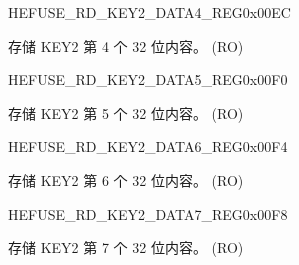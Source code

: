 \begin{register}{H}{EFUSE\_RD\_KEY2\_DATA4\_REG}{0x00EC}\label{regdesc:EFUSERDKEY2DATA4REG}
%
\regnewline%
\begin{regdesc}\begin{reglist}
\label{fielddesc:EFUSEKEY2DATA4}\item [EFUSE\_KEY2\_DATA4] 存储 KEY2 第 4 个 32 位内容。 (RO)
\end{reglist}\end{regdesc}
\end{register}


\begin{register}{H}{EFUSE\_RD\_KEY2\_DATA5\_REG}{0x00F0}\label{regdesc:EFUSERDKEY2DATA5REG}
%
\regnewline%
\begin{regdesc}\begin{reglist}
\label{fielddesc:EFUSEKEY2DATA5}\item [EFUSE\_KEY2\_DATA5] 存储 KEY2 第 5 个 32 位内容。 (RO)
\end{reglist}\end{regdesc}
\end{register}


\begin{register}{H}{EFUSE\_RD\_KEY2\_DATA6\_REG}{0x00F4}\label{regdesc:EFUSERDKEY2DATA6REG}
%
\regnewline%
\begin{regdesc}\begin{reglist}
\label{fielddesc:EFUSEKEY2DATA6}\item [EFUSE\_KEY2\_DATA6] 存储 KEY2 第 6 个 32 位内容。 (RO)
\end{reglist}\end{regdesc}
\end{register}


\begin{register}{H}{EFUSE\_RD\_KEY2\_DATA7\_REG}{0x00F8}\label{regdesc:EFUSERDKEY2DATA7REG}
%
\regnewline%
\begin{regdesc}\begin{reglist}
\label{fielddesc:EFUSEKEY2DATA7}\item [EFUSE\_KEY2\_DATA7] 存储 KEY2 第 7 个 32 位内容。 (RO)
\end{reglist}\end{regdesc}
\end{register}


